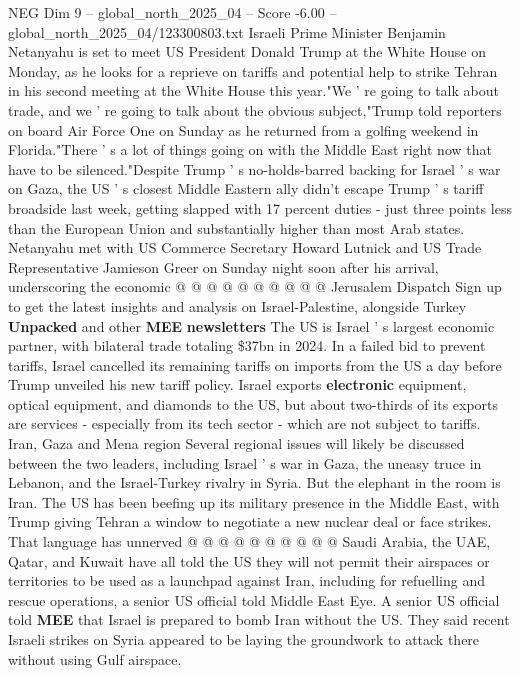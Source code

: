 \begin{textsample}{NEG Dim 9 – global\_north\_2025\_04 – Score -6.00 – global\_north\_2025\_04/123300803.txt}  \label{ex:f9_neg_029}
Israeli Prime Minister Benjamin Netanyahu is set to meet US President Donald Trump at the White House on Monday, as he looks for a reprieve on tariffs and potential help to strike Tehran in his second meeting at the White House this year."We ' re going to talk about trade, and we ' re going to talk about the obvious subject,"Trump told reporters on board Air Force One on Sunday as he returned from a golfing weekend in Florida."There ' s a lot of things going on with the Middle East right now that have to be silenced."Despite Trump ' s no-holds-barred backing for Israel ' s war on Gaza, the US ' s closest Middle Eastern ally didn't escape Trump ' s tariff broadside last week, getting slapped with 17 percent duties - just three points less than the European Union and substantially higher than most Arab states.
Netanyahu met with US Commerce Secretary Howard Lutnick and US Trade Representative Jamieson Greer on Sunday night soon after his arrival, underscoring the economic @ @ @ @ @ @ @ @ @ @ Jerusalem Dispatch Sign up to get the latest insights and analysis on Israel-Palestine, alongside Turkey \textbf{Unpacked} and other \textbf{MEE} \textbf{newsletters} The US is Israel ' s largest economic partner, with bilateral trade totaling \$37bn in 2024.
In a failed bid to prevent tariffs, Israel cancelled its remaining tariffs on imports from the US a day before Trump unveiled his new tariff policy.
Israel exports \textbf{electronic} equipment, optical equipment, and diamonds to the US, but about two-thirds of its exports are services - especially from its tech sector - which are not subject to tariffs.
Iran, Gaza and Mena region Several regional issues will likely be discussed between the two leaders, including Israel ' s war in Gaza, the uneasy truce in Lebanon, and the Israel-Turkey rivalry in Syria.
But the elephant in the room is Iran.
The US has been beefing up its military presence in the Middle East, with Trump giving Tehran a window to negotiate a new nuclear deal or face strikes.
That language has unnerved @ @ @ @ @ @ @ @ @ @ Saudi Arabia, the UAE, Qatar, and Kuwait have all told the US they will not permit their airspaces or territories to be used as a launchpad against Iran, including for refuelling and rescue operations, a senior US official told Middle East Eye.
A senior US official told \textbf{MEE} that Israel is prepared to bomb Iran without the US.
They said recent Israeli strikes on Syria appeared to be laying the groundwork to attack there without using Gulf airspace.

\end{textsample}
